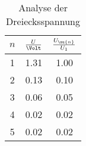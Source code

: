 \begin{table}
  \centering
  \begin{tabular}{c c c}
    \toprule
    $n$ & $\frac{U}{\Volt}$ & $\frac{U_\su{n}}{U_1}$ \\
    \midrule
    1   &   1.31   &  1.00  \\
    2   &   0.13   &  0.10  \\
    3   &   0.06   &  0.05  \\
    4   &   0.02   &  0.02  \\
    5   &   0.02   &  0.02  \\
    \bottomrule
  \end{tabular}
  \caption{Analyse der Dreiecksspannung}
  \label{anadrei}
\end{table}
